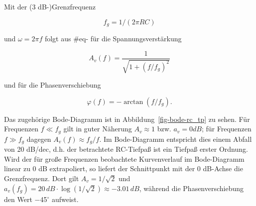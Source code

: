 \documentclass[
  ngerman,
  letterpaper,
]{scrbook}
\begin{document}
Mit der (3 dB-)Grenzfrequenz

\[
f_g = 1/(2 \pi RC)
\]

und \(\omega = 2 \pi f\) folgt aus \#eq- für die Spannungsverstärkung

\[
A_v(f) =  \frac{1}{\sqrt{1+(f/f_g)^2}} 
\]

und für die Phasenverschiebung

\[
\varphi(f) = −\arctan(f/f_g).
\]

Das zugehörige Bode-Diagramm ist in Abbildung~\ref{fig-bode-rc_tp} zu
sehen. Für Frequenzen \(f \ll f_g\) gilt in guter Näherung
\(A_v \approx 1\) bzw. \(a_v = 0 dB\); für Frequenzen \(f \gg f_g\)
dagegen \(A_v(f) \approx f_g/f\). Im Bode-Diagramm entspricht dies einem
Abfall von 20 dB/dec, d.h. der betrachtete RC-Tiefpaß ist ein Tiefpaß
erster Ordnung. Wird der für große Frequenzen beobachtete Kurvenverlauf
im Bode-Diagramm linear zu 0 dB extrapoliert, so liefert der
Schnittpunkt mit der 0 dB-Achse die Grenzfrequenz. Dort gilt
\(A_v = 1/\sqrt{2}\) und
\(a_v(f_g) = 20\,dB \cdot \log(1/\sqrt{2}) \approx -3.01 \,dB\), während
die Phasenverschiebung den Wert −45\(^{\circ}\) aufweist.
\end{document}
